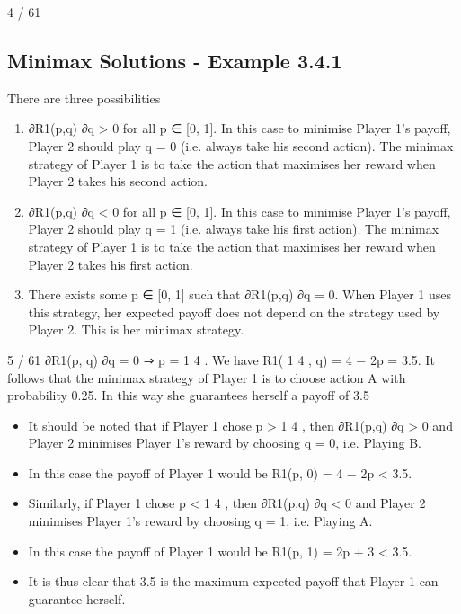 \documentclass[]{report}
\begin{document}
4 / 61
\subsection{Minimax Solutions - Example 3.4.1}
There are three possibilities
\begin{enumerate}
	\item  ∂R1(p,q)
	∂q > 0 for all p ∈ [0, 1]. In this case to minimise
	Player 1’s payoff, Player 2 should play q = 0 (i.e.
	always take his second action). The minimax strategy
	of Player 1 is to take the action that maximises her
	reward when Player 2 takes his second action.
	\item  ∂R1(p,q)
	∂q < 0 for all p ∈ [0, 1]. In this case to minimise
	Player 1’s payoff, Player 2 should play q = 1 (i.e.
	always take his first action). The minimax strategy of
	Player 1 is to take the action that maximises her
	reward when Player 2 takes his first action.
	\item There exists some p ∈ [0, 1] such that ∂R1(p,q)
	∂q = 0.
	When Player 1 uses this strategy, her expected payoff
	does not depend on the strategy used by Player 2.
	This is her minimax strategy.
\end{enumerate}

5 / 61
∂R1(p, q)
∂q
= 0 ⇒ p =
1
4
.
We have
R1(
1
4
, q) = 4 − 2p = 3.5.
It follows that the minimax strategy of Player 1 is to choose action
A with probability 0.25. In this way she guarantees herself a payoff
of 3.5
\begin{itemize}
	\item It should be noted that if Player 1 chose p >
	1
	4
	, then ∂R1(p,q)
	∂q > 0
	and Player 2 minimises Player 1’s reward by choosing q = 0, i.e.
	Playing B.
	\item In this case the payoff of Player 1 would be
	R1(p, 0) = 4 − 2p < 3.5.
	\item 	Similarly, if Player 1 chose p <
	1
	4
	, then ∂R1(p,q)
	∂q < 0 and Player 2
	minimises Player 1’s reward by choosing q = 1, i.e. Playing A.
	\item 	In this case the payoff of Player 1 would be
	R1(p, 1) = 2p + 3 < 3.5.
		\item  It is thus clear that 3.5 is the maximum
	expected payoff that Player 1 can guarantee herself.
\end{itemize}
\end{document}
